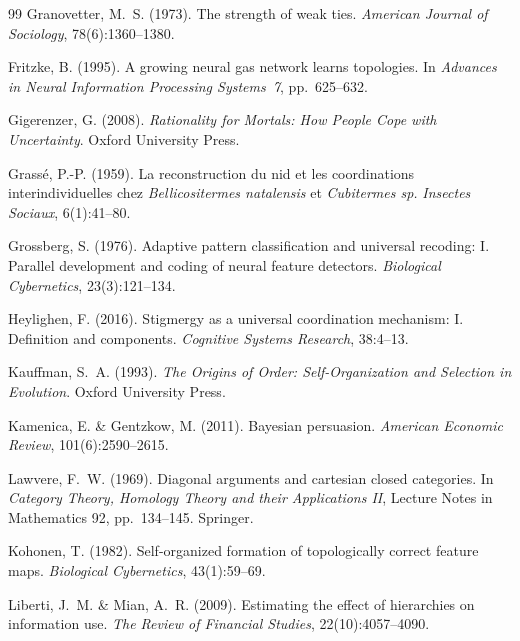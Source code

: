 \documentclass[11pt,a4paper]{article}
\begin{document}
\begin{thebibliography}{99}
Granovetter, M.~S. (1973).
\newblock The strength of weak ties.
\newblock \emph{American Journal of Sociology}, 78(6):1360--1380.

Fritzke, B. (1995).
\newblock A growing neural gas network learns topologies.
\newblock In \emph{Advances in Neural Information Processing Systems~7}, pp.~625--632.

Gigerenzer, G. (2008).
\newblock \emph{Rationality for Mortals: How People Cope with Uncertainty}.
\newblock Oxford University Press.


Grass\'{e}, P.-P. (1959).
\newblock La reconstruction du nid et les coordinations interindividuelles chez \emph{Bellicositermes natalensis} et \emph{Cubitermes sp.}
\newblock \emph{Insectes Sociaux}, 6(1):41--80.

Grossberg, S. (1976).
\newblock Adaptive pattern classification and universal recoding: {I}. {P}arallel development and coding of neural feature detectors.
\newblock \emph{Biological Cybernetics}, 23(3):121--134.

Heylighen, F. (2016).
\newblock Stigmergy as a universal coordination mechanism: {I}. {D}efinition and components.
\newblock \emph{Cognitive Systems Research}, 38:4--13.

Kauffman, S.~A. (1993).
\newblock \emph{The Origins of Order: Self-Organization and Selection in Evolution}.
\newblock Oxford University Press.

Kamenica, E. \& Gentzkow, M. (2011).
\newblock Bayesian persuasion.
\newblock \emph{American Economic Review}, 101(6):2590--2615.

Lawvere, F.~W. (1969).
\newblock Diagonal arguments and cartesian closed categories.
\newblock In \emph{Category Theory, Homology Theory and their Applications II}, Lecture Notes in Mathematics 92, pp.~134--145. Springer.

Kohonen, T. (1982).
\newblock Self-organized formation of topologically correct feature maps.
\newblock \emph{Biological Cybernetics}, 43(1):59--69.

Liberti, J.~M. \& Mian, A.~R. (2009).
\newblock Estimating the effect of hierarchies on information use.
\newblock \emph{The Review of Financial Studies}, 22(10):4057--4090.


\end{thebibliography}
\end{document}
